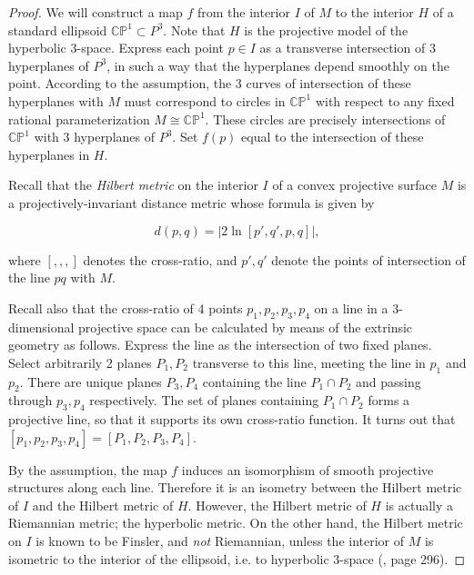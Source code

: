 \documentclass[11pt]{article}
\numberwithin{equation}{section}
\theoremstyle{plain}
\theoremstyle{remark}
\begin{document}

\begin{proof} We will construct a map $f$ from the interior $I$ of $M$ to the interior $H$ of a standard ellipsoid $\mathbb{CP}^{1}\subset P^{3}$. Note that $H$ is the projective model of the hyperbolic 3-space. Express each point $p\in I$ as a transverse intersection of 3 hyperplanes of $P^{3}$, in such a way that the hyperplanes depend smoothly on the point. According to the assumption, the 3 curves of intersection of these hyperplanes with $M$ must correspond to circles in $\mathbb{CP}^{1}$ with respect to any fixed rational parameterization $M\cong \mathbb{CP}^{1}$. These circles are precisely intersections of $\mathbb{CP}^{1}$ with 3 hyperplanes of $P^{3}$. Set $f(p)$ equal to the intersection of these hyperplanes in $H$.

Recall that the \emph{Hilbert metric} on the interior $I$ of a convex projective surface $M$ is a projectively-invariant distance metric whose formula is given by

\[d(p,q)=|2\operatorname{ln}[p',q',p,q]|,\]

where $[,,,]$ denotes the cross-ratio, and $p',q'$ denote the points of intersection of the line $pq$ with $M$.

Recall also that the cross-ratio of 4 points $p_1,p_2,p_3,p_4$ on a line in a 3-dimensional projective space can be calculated by means of the extrinsic geometry as follows. Express the line as the intersection of two fixed planes. Select arbitrarily 2 planes $P_1,P_2$ transverse to this line, meeting the line in $p_1$ and $p_2$. There are unique planes $P_3,P_4$ containing the line $P_1\cap P_2$ and passing through $p_3,p_4$ respectively. The set of planes containing $P_1\cap P_2$ forms a projective line, so that it supports its own cross-ratio function. It turns out that $[p_1,p_2,p_3,p_4]=[P_1,P_2,P_3,P_4]$.

By the assumption, the map $f$ induces an isomorphism of smooth projective structures along each line. Therefore it is an isometry between the Hilbert metric of $I$ and the Hilbert metric of $H$. However, the Hilbert metric of $H$ is actually a Riemannian metric; the hyperbolic metric. On the other hand, the Hilbert metric on $I$ is known to be Finsler, and \emph{not} Riemannian, unless the interior of $M$ is isometric to the interior of the ellipsoid, i.e. to hyperbolic 3-space (\cite{hilbertmetricfinslerpaper}, page 296).
\end{proof}
\end{document}

